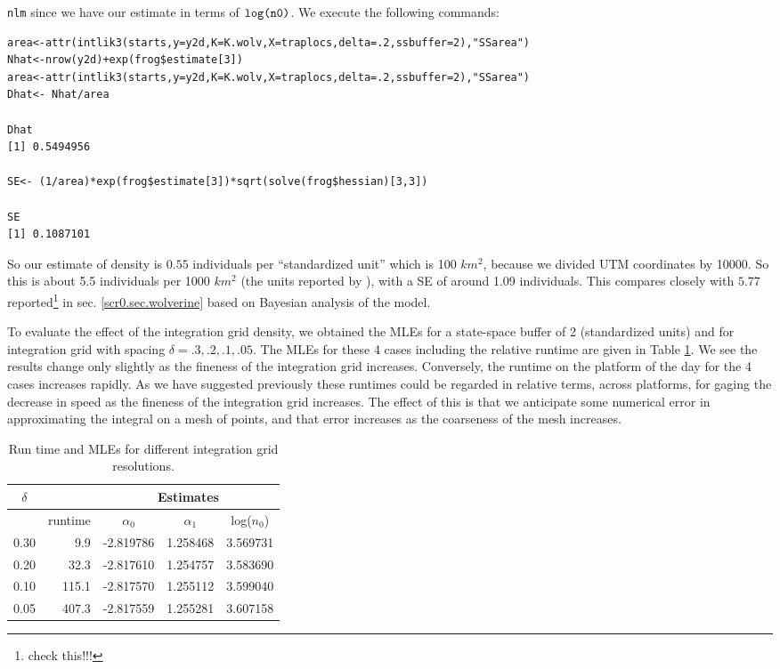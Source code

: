 \mbox{\tt nlm} since we have our  estimate in terms of $\mbox{\tt
  log(n0)}$. We execute the following commands:
{\small 
\begin{verbatim}
area<-attr(intlik3(starts,y=y2d,K=K.wolv,X=traplocs,delta=.2,ssbuffer=2),"SSarea")
Nhat<-nrow(y2d)+exp(frog$estimate[3])
area<-attr(intlik3(starts,y=y2d,K=K.wolv,X=traplocs,delta=.2,ssbuffer=2),"SSarea")
Dhat<- Nhat/area

Dhat
[1] 0.5494956

SE<- (1/area)*exp(frog$estimate[3])*sqrt(solve(frog$hessian)[3,3])

SE
[1] 0.1087101
\end{verbatim}
} 
So our estimate of density is $0.55$ individuals per ``standardized
unit'' which is 100 $km^2$, because we divided UTM coordinates by
10000.  So this is about 5.5 individuals per 1000 $km^2$ (the units
reported by \citep{royle_etal:2011jwm}), with a SE of around 1.09
individuals.  This compares closely with $5.77$
reported\footnote{check this!!!} in
sec. \ref{scr0.sec.wolverine} based on Bayesian
analysis of the model.


To evaluate the effect of the integration grid density, 
we obtained the MLEs for a state-space buffer of 2 (standardized
units) and for integration grid with spacing $\delta = .3, .2, .1,
.05$. The MLEs for these 4 cases including the relative runtime are
given in Table \ref{mle.tab.integration}.
We see the results change only slightly as the fineness of the
integration grid increases. Conversely, the runtime on the platform of
the day for the 4 cases increases rapidly. 
As we have suggested previously these runtimes could be regarded in
relative terms,  across platforms, for gaging the decrease in
speed as the fineness of the integration grid increases. The effect of
this is that we anticipate some numerical error in approximating the
integral on a mesh of points, and that error increases as the
coarseness of the mesh increases. 


\begin{table}[ht]
\centering
\caption{Run time and MLEs for different integration grid resolutions.}
\begin{tabular}{crccc}
\hline \hline
$\delta$ &   & \multicolumn{3}{c}{Estimates} \\ \hline
         &  runtime        & $\alpha_0$ & $\alpha_1$ & log($n_0$) \\ \hline
 0.30   &  9.9  &  -2.819786 & 1.258468 & 3.569731  \\
 0.20   & 32.3  &  -2.817610 & 1.254757 & 3.583690 \\
 0.10  & 115.1  &  -2.817570 & 1.255112 & 3.599040 \\
 0.05 &  407.3 &   -2.817559&  1.255281&  3.607158 \\ \hline
\end{tabular}
\label{mle.tab.integration}
\end{table}


